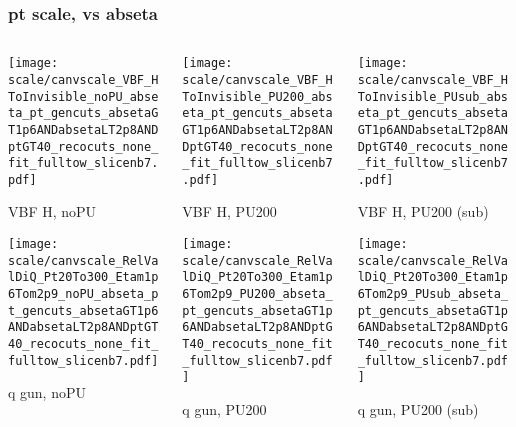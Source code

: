 \documentclass[8pt]{beamer}
\begin{document}
  \begin{frame}
  \frametitle{pt scale, vs abseta}
  
  \begin{columns}
   \begin{column}{0.35\textwidth}
     \texttt{[image: scale/canvscale\_VBF\_HToInvisible\_noPU\_abseta\_pt\_gencuts\_absetaGT1p6ANDabsetaLT2p8ANDptGT40\_recocuts\_none\_fit\_fulltow\_slicenb7.pdf]}
     
     VBF H, noPU
    
     \texttt{[image: scale/canvscale\_RelValDiQ\_Pt20To300\_Etam1p6Tom2p9\_noPU\_abseta\_pt\_gencuts\_absetaGT1p6ANDabsetaLT2p8ANDptGT40\_recocuts\_none\_fit\_fulltow\_slicenb7.pdf]}
     
     q gun, noPU
   \end{column}
   \begin{column}{0.35\textwidth}
     \texttt{[image: scale/canvscale\_VBF\_HToInvisible\_PU200\_abseta\_pt\_gencuts\_absetaGT1p6ANDabsetaLT2p8ANDptGT40\_recocuts\_none\_fit\_fulltow\_slicenb7.pdf]}
     
     VBF H, PU200
    
     \texttt{[image: scale/canvscale\_RelValDiQ\_Pt20To300\_Etam1p6Tom2p9\_PU200\_abseta\_pt\_gencuts\_absetaGT1p6ANDabsetaLT2p8ANDptGT40\_recocuts\_none\_fit\_fulltow\_slicenb7.pdf]}
     
     q gun, PU200
   \end{column}
   \begin{column}{0.35\textwidth}
     \texttt{[image: scale/canvscale\_VBF\_HToInvisible\_PUsub\_abseta\_pt\_gencuts\_absetaGT1p6ANDabsetaLT2p8ANDptGT40\_recocuts\_none\_fit\_fulltow\_slicenb7.pdf]}
     
     VBF H, PU200 (sub)
    
     \texttt{[image: scale/canvscale\_RelValDiQ\_Pt20To300\_Etam1p6Tom2p9\_PUsub\_abseta\_pt\_gencuts\_absetaGT1p6ANDabsetaLT2p8ANDptGT40\_recocuts\_none\_fit\_fulltow\_slicenb7.pdf]}
     
     q gun, PU200 (sub)
   \end{column}
  \end{columns}
 \end{frame}
\end{document}

